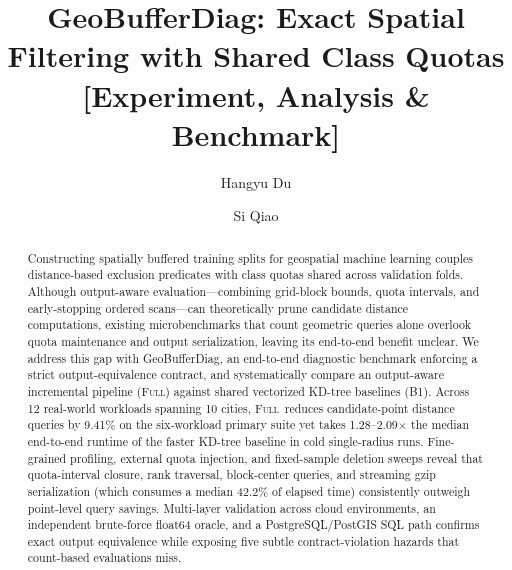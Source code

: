 \documentclass[sigconf, nonacm]{acmart}
\newcommand{\sys}{GeoBufferDiag}
\newcommand{\full}{\textsc{Full}}
\begin{document}
\title[GeoBufferDiag: Exact Spatial Filtering with Shared Class Quotas]{GeoBufferDiag: Exact Spatial Filtering with Shared Class Quotas [Experiment, Analysis \& Benchmark]}
\author{Hangyu Du}
\author{Si Qiao}
\correspondingauthor
{}
\renewcommand{\shortauthors}{Hangyu Du and Si Qiao}

\begin{abstract}
Constructing spatially buffered training splits for geospatial machine learning couples distance-based exclusion predicates with class quotas shared across validation folds. Although output-aware evaluation---combining grid-block bounds, quota intervals, and early-stopping ordered scans---can theoretically prune candidate distance computations, existing microbenchmarks that count geometric queries alone overlook quota maintenance and output serialization, leaving its end-to-end benefit unclear. We address this gap with \sys, an end-to-end diagnostic benchmark enforcing a strict output-equivalence contract, and systematically compare an output-aware incremental pipeline (\full) against shared vectorized KD-tree baselines (B1). Across 12 real-world workloads spanning 10 cities, \full\ reduces candidate-point distance queries by 9.41\% on the six-workload primary suite yet takes 1.28--2.09$\times$ the median end-to-end runtime of the faster KD-tree baseline in cold single-radius runs. Fine-grained profiling, external quota injection, and fixed-sample deletion sweeps reveal that quota-interval closure, rank traversal, block-center queries, and streaming gzip serialization (which consumes a median 42.2\% of elapsed time) consistently outweigh point-level query savings. Multi-layer validation across cloud environments, an independent brute-force float64 oracle, and a PostgreSQL/PostGIS SQL path confirms exact output equivalence while exposing five subtle contract-violation hazards that count-based evaluations miss.
\end{abstract}
\maketitle
\vldbtopmatter
\end{document}
